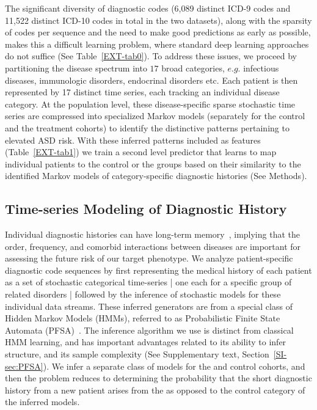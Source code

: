 \documentclass[onecolumn,10pt]{IEEEtran}
\begin{document}
The significant diversity of diagnostic codes (6,089 distinct ICD-9 codes and 11,522 distinct ICD-10 codes in total in the two datasets), along with the sparsity of codes per sequence and the need to make good predictions as early as possible,  makes this a difficult learning problem, where standard deep learning approaches do not suffice (See Table~\ref{EXT-tab0}). To address these issues, we proceed by  partitioning the  disease spectrum into $17 $ broad categories, $e.g.$ infectious diseases, immunologic disorders, endocrinal disorders etc. Each patient is then represented by 17 distinct time series, each  tracking an individual disease category. At the population level, these disease-specific sparse stochastic time series are  compressed into specialized Markov models (separately for the control and the treatment cohorts) to identify  the distinctive patterns  pertaining to elevated ASD risk. With these inferred patterns included as features (Table~\ref{EXT-tab1}) we train a second level predictor that learns to map   individual patients  to the control or the \treatment groups based on their  similarity  to the identified  Markov models of category-specific diagnostic histories (See Methods). %
\subsection*{Time-series Modeling of  Diagnostic History}
Individual diagnostic histories  can have long-term memory~\cite{ltgranger80}, implying that the order, frequency, and comorbid interactions between diseases are   important for assessing the future risk of our target phenotype. 
We analyze  patient-specific  diagnostic code sequences by first  representing the medical history of each patient as a set of stochastic categorical time-series | one each for a specific group of related disorders |  followed by the inference of stochastic models  for  these individual data streams. These inferred generators are from a special class of  Hidden Markov Models (HMMs), referred to as Probabilistic Finite State Automata (PFSA)~\cite{CL12g}. The inference algorithm we use is distinct from classical HMM learning, and has important advantages related to its ability to infer structure, and its sample complexity (See Supplementary text, Section~\ref{SI-sec:PFSA}). We infer a separate class of models for the \treatment and control cohorts, and then the problem reduces to determining the probability that the short diagnostic history from a  new  patient arises from the \treatment as opposed to the control category of the inferred models. 
\end{document}

